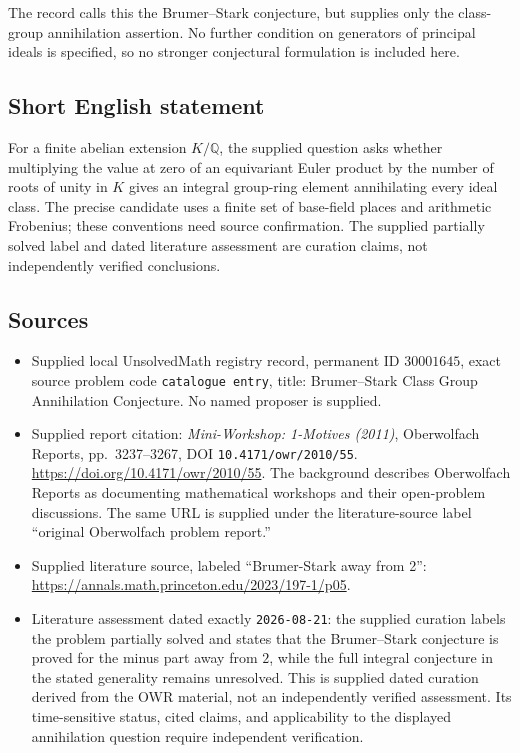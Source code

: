 \documentclass[11pt]{article}
\newcommand{\Q}{\mathbb{Q}}
\begin{document}
The record calls this the Brumer--Stark conjecture, but supplies only the class-group annihilation assertion. No further condition on generators of principal ideals is specified, so no stronger conjectural formulation is included here.
\subsection{Short English statement}
For a finite abelian extension \(K/\Q\), the supplied question asks whether multiplying the value at zero of an equivariant Euler product by the number of roots of unity in \(K\) gives an integral group-ring element annihilating every ideal class. The precise candidate uses a finite set of base-field places and arithmetic Frobenius; these conventions need source confirmation. The supplied partially solved label and dated literature assessment are curation claims, not independently verified conclusions.
\subsection{Sources}
\begin{itemize}
\item Supplied local UnsolvedMath registry record, permanent ID \(30001645\), exact source problem code \texttt{catalogue entry}, title: Brumer--Stark Class Group Annihilation Conjecture. No named proposer is supplied.
\item Supplied report citation: \emph{Mini-Workshop: 1-Motives (2011)}, Oberwolfach Reports, pp.~3237--3267, DOI \texttt{10.4171/owr/2010/55}. \url{https://doi.org/10.4171/owr/2010/55}. The background describes Oberwolfach Reports as documenting mathematical workshops and their open-problem discussions. The same URL is supplied under the literature-source label ``original Oberwolfach problem report.''
\item Supplied literature source, labeled ``Brumer-Stark away from 2'': \url{https://annals.math.princeton.edu/2023/197-1/p05}.
\item Literature assessment dated exactly \texttt{2026-08-21}: the supplied curation labels the problem partially solved and states that the Brumer--Stark conjecture is proved for the minus part away from \(2\), while the full integral conjecture in the stated generality remains unresolved. This is supplied dated curation derived from the OWR material, not an independently verified assessment. Its time-sensitive status, cited claims, and applicability to the displayed annihilation question require independent verification.
\end{itemize}
\end{document}
